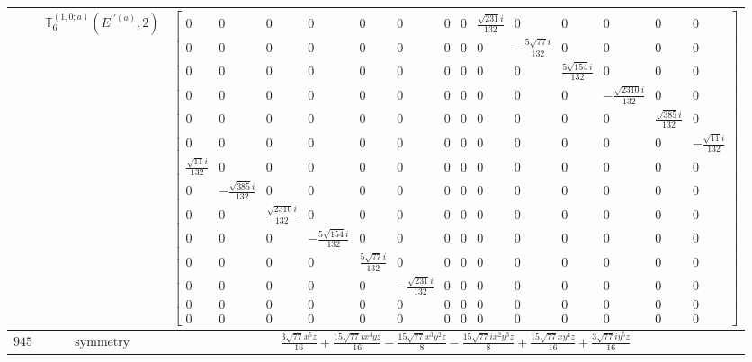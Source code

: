 \documentclass[fleqn,8pt,landscape]{jsarticle}
\begin{document}
\begin{longtable}{ccc}
$  $ & $ \mathbb{T}_{6}^{(1,0;a)}(E^{\prime\prime(a)},2) $ & $ \begin{bmatrix} 0 & 0 & 0 & 0 & 0 & 0 & 0 & 0 & \frac{\sqrt{231} i}{132} & 0 & 0 & 0 & 0 & 0 \\ 0 & 0 & 0 & 0 & 0 & 0 & 0 & 0 & 0 & - \frac{5 \sqrt{77} i}{132} & 0 & 0 & 0 & 0 \\ 0 & 0 & 0 & 0 & 0 & 0 & 0 & 0 & 0 & 0 & \frac{5 \sqrt{154} i}{132} & 0 & 0 & 0 \\ 0 & 0 & 0 & 0 & 0 & 0 & 0 & 0 & 0 & 0 & 0 & - \frac{\sqrt{2310} i}{132} & 0 & 0 \\ 0 & 0 & 0 & 0 & 0 & 0 & 0 & 0 & 0 & 0 & 0 & 0 & \frac{\sqrt{385} i}{132} & 0 \\ 0 & 0 & 0 & 0 & 0 & 0 & 0 & 0 & 0 & 0 & 0 & 0 & 0 & - \frac{\sqrt{11} i}{132} \\ \frac{\sqrt{11} i}{132} & 0 & 0 & 0 & 0 & 0 & 0 & 0 & 0 & 0 & 0 & 0 & 0 & 0 \\ 0 & - \frac{\sqrt{385} i}{132} & 0 & 0 & 0 & 0 & 0 & 0 & 0 & 0 & 0 & 0 & 0 & 0 \\ 0 & 0 & \frac{\sqrt{2310} i}{132} & 0 & 0 & 0 & 0 & 0 & 0 & 0 & 0 & 0 & 0 & 0 \\ 0 & 0 & 0 & - \frac{5 \sqrt{154} i}{132} & 0 & 0 & 0 & 0 & 0 & 0 & 0 & 0 & 0 & 0 \\ 0 & 0 & 0 & 0 & \frac{5 \sqrt{77} i}{132} & 0 & 0 & 0 & 0 & 0 & 0 & 0 & 0 & 0 \\ 0 & 0 & 0 & 0 & 0 & - \frac{\sqrt{231} i}{132} & 0 & 0 & 0 & 0 & 0 & 0 & 0 & 0 \\ 0 & 0 & 0 & 0 & 0 & 0 & 0 & 0 & 0 & 0 & 0 & 0 & 0 & 0 \\ 0 & 0 & 0 & 0 & 0 & 0 & 0 & 0 & 0 & 0 & 0 & 0 & 0 & 0 \end{bmatrix} $ \\ \hline
$ 945 $ & $ \text{symmetry} $ & $ \frac{3 \sqrt{77} x^{5} z}{16} + \frac{15 \sqrt{77} i x^{4} y z}{16} - \frac{15 \sqrt{77} x^{3} y^{2} z}{8} - \frac{15 \sqrt{77} i x^{2} y^{3} z}{8} + \frac{15 \sqrt{77} x y^{4} z}{16} + \frac{3 \sqrt{77} i y^{5} z}{16} $ \\

\end{longtable}
\end{document}
